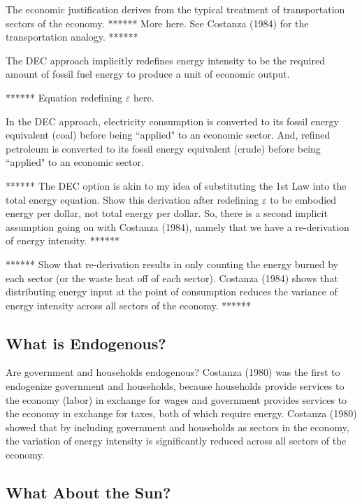 \documentclass[authoryear,preprint,review,12pt]{elsarticle}
\begin{document}
The economic justification derives from the typical treatment of transportation sectors of the economy. ****** More here. See Costanza (1984) for the transportation analogy. ******

The DEC approach implicitly redefines energy intensity to be the required amount of fossil fuel energy to produce a unit of economic output. 

****** Equation redefining $\varepsilon$ here.

In the DEC approach, electricity consumption is converted to its fossil energy equivalent (coal) before being ``applied" to an economic sector. And, refined petroleum is converted to its fossil energy equivalent (crude) before being ``applied" to an economic sector.

****** The DEC option is akin to my idea of substituting the 1st Law into the total energy equation. Show this derivation after redefining $\varepsilon$ to be embodied energy per dollar, not total energy per dollar. So, there is a second implicit assumption going on with Costanza (1984), namely that we have a re-derivation of energy intensity. ******

****** Show that re-derivation results in only counting the energy burned by each sector (or the waste heat off of each sector). Costanza (1984) shows that distributing energy input at the point of consumption reduces the variance of energy intensity across all sectors of the economy. ******


\subsection{What is Endogenous?}

Are government and households endogenous? Costanza (1980) was the first to endogenize government and households, because households provide services to the economy (labor) in exchange for wages and government provides services to the economy in exchange for taxes, both of which require energy. Costanza (1980) showed that by including government and households as sectors in the economy, the variation of energy intensity is significantly reduced across all sectors of the economy. 


\subsection{What About the Sun?}
\end{document}
